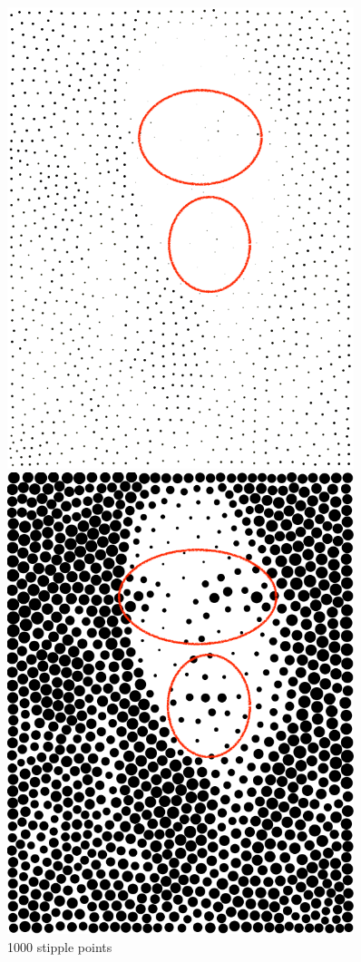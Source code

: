 \documentclass[11pt]{article}
\begin{document}
\begin{figure}[htbp]
\centering
\begin{minipage}[t]{0.48\textwidth}
\centering
\includegraphics[width = 0.9\textwidth]{fairyeyes-1000.png}
\caption{1000 stipple points}
\end{minipage}
\begin{minipage}[t]{0.48\textwidth}
\centering
\includegraphics[width = 0.9\textwidth]{faireyes_vor_1000.png}

\end{minipage}
\end{figure}
\end{document}
